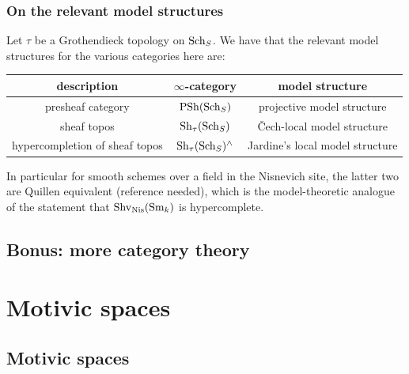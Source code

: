 \documentclass[11pt,openany]{book}
\begin{document}


\subsection{On the relevant model structures}
Let $\tau$ be a Grothendieck topology on $\mathrm{Sch}_S$. We have that the relevant model structures for the various categories here are:
\begin{center}
\begin{tabular}{|c | c | c|}
    \hline
    description & $\infty$-category & model structure\\
    \hline\hline
    presheaf category & $\mathrm{PSh}(\mathrm{Sch}_S)$ & projective model structure\\
    sheaf topos & $\mathrm{Sh}_\tau(\mathrm{Sch}_S)$ & \v{C}ech-local model structure\\
    hypercompletion of sheaf topos & $\mathrm{Sh}_\tau(\mathrm{Sch}_S)^\wedge$ & Jardine's local model structure\\
    \hline
\end{tabular}
\end{center}
In particular for smooth schemes over a field in the Nisnevich site, the latter two are Quillen equivalent (reference needed), which is the model-theoretic analogue of the statement that $\mathrm{Shv}_{\mathrm{Nis}}(\mathrm{Sm}_k)$ is hypercomplete.


\section{Bonus: more category theory}



\chapter{Motivic spaces}
\minitoc
\section{Motivic spaces}
\end{document}
